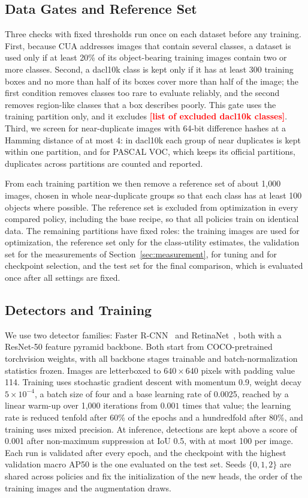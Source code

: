 \documentclass[conference]{IEEEtran}
\newcommand{\todo}[1]{\textcolor{red}{\textbf{[#1]}}}
\begin{document}
\subsection{Data Gates and Reference Set}
\label{sec:setup_gates}

Three checks with fixed thresholds run once on each dataset before any training. First, because CUA addresses images that contain several classes, a dataset is used only if at least 20\% of its object-bearing training images contain two or more classes. Second, a dacl10k class is kept only if it has at least 300 training boxes and no more than half of its boxes cover more than half of the image; the first condition removes classes too rare to evaluate reliably, and the second removes region-like classes that a box describes poorly. This gate uses the training partition only, and it excludes \todo{list of excluded dacl10k classes}. Third, we screen for near-duplicate images with 64-bit difference hashes at a Hamming distance of at most 4: in dacl10k each group of near duplicates is kept within one partition, and for PASCAL VOC, which keeps its official partitions, duplicates across partitions are counted and reported.

From each training partition we then remove a reference set of about 1,000 images, chosen in whole near-duplicate groups so that each class has at least 100 objects where possible. The reference set is excluded from optimization in every compared policy, including the base recipe, so that all policies train on identical data. The remaining partitions have fixed roles: the training images are used for optimization, the reference set only for the class-utility estimates, the validation set for the measurements of Section~\ref{sec:measurement}, for tuning and for checkpoint selection, and the test set for the final comparison, which is evaluated once after all settings are fixed.

\subsection{Detectors and Training}
\label{sec:setup_training}

We use two detector families: Faster R-CNN~\cite{ren2017faster} and RetinaNet~\cite{lin2017focal}, both with a ResNet-50 feature pyramid backbone. Both start from COCO-pretrained torchvision weights, with all backbone stages trainable and batch-normalization statistics frozen. Images are letterboxed to $640\times640$ pixels with padding value 114. Training uses stochastic gradient descent with momentum 0.9, weight decay $5\times10^{-4}$, a batch size of four and a base learning rate of 0.0025, reached by a linear warm-up over 1,000 iterations from $0.001$ times that value; the learning rate is reduced tenfold after 60\% of the epochs and a hundredfold after 80\%, and training uses mixed precision. At inference, detections are kept above a score of 0.001 after non-maximum suppression at IoU 0.5, with at most 100 per image. Each run is validated after every epoch, and the checkpoint with the highest validation macro AP50 is the one evaluated on the test set. Seeds $\{0,1,2\}$ are shared across policies and fix the initialization of the new heads, the order of the training images and the augmentation draws.
\end{document}

